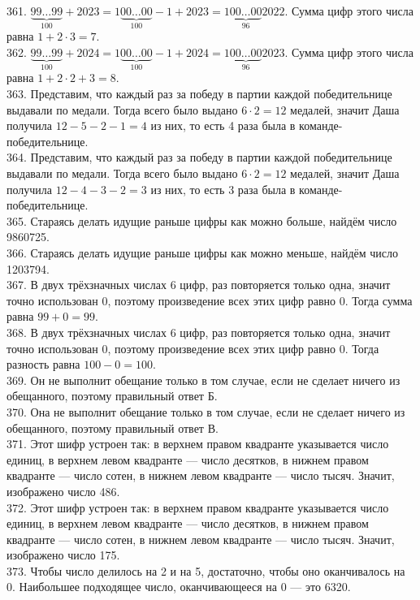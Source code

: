 361. $\underbrace{99\ldots99}_{100}+2023=1\underbrace{00\ldots00}_{100}-1+2023=1\underbrace{00\ldots00}_{96}2022.$ Сумма цифр этого числа равна $1+2\cdot3=7.$\\
362. $\underbrace{99\ldots99}_{100}+2024=1\underbrace{00\ldots00}_{100}-1+2024=1\underbrace{00\ldots00}_{96}2023.$ Сумма цифр этого числа равна $1+2\cdot2+3=8.$\\
363. Представим, что каждый раз за победу в партии каждой победительнице выдавали по медали. Тогда всего было выдано $6\cdot2=12$ медалей, значит Даша получила $12-5-2-1=4$ из них, то есть 4 раза была в команде-победительнице.\\
364. Представим, что каждый раз за победу в партии каждой победительнице выдавали по медали. Тогда всего было выдано $6\cdot2=12$ медалей, значит Даша получила $12-4-3-2=3$ из них, то есть 3 раза была в команде-победительнице.\\
365. Стараясь делать идущие раньше цифры как можно больше, найдём число 9860725.\\
366. Стараясь делать идущие раньше цифры как можно меньше, найдём число 1203794.\\
367. В двух трёхзначных числах 6 цифр, раз повторяется только одна, значит точно использован 0, поэтому произведение всех этих цифр равно 0. Тогда сумма равна $99+0=99.$\\
368. В двух трёхзначных числах 6 цифр, раз повторяется только одна, значит точно использован 0, поэтому произведение всех этих цифр равно 0. Тогда разность равна $100-0=100.$\\
369. Он не выполнит обещание только в том случае, если не сделает ничего из обещанного, поэтому правильный ответ Б.\\
370. Она не выполнит обещание только в том случае, если не сделает ничего из обещанного, поэтому правильный ответ В.\\
371. Этот шифр устроен так: в верхнем правом квадранте указывается число единиц, в верхнем левом квадранте --- число десятков,
в нижнем правом квадранте --- число сотен, в нижнем левом квадранте --- число тысяч. Значит, изображено число 486.\\
372. Этот шифр устроен так: в верхнем правом квадранте указывается число единиц, в верхнем левом квадранте --- число десятков,
в нижнем правом квадранте --- число сотен, в нижнем левом квадранте --- число тысяч. Значит, изображено число 175.\\
373. Чтобы число делилось на 2 и на 5, достаточно, чтобы оно оканчивалось на 0. Наибольшее подходящее число, оканчивающееся на 0 --- это 6320.\\
